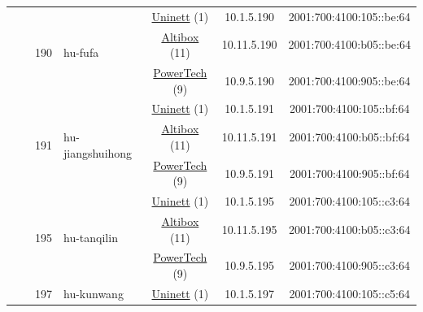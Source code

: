 \begin{small}
\begin{center}
\begin{longtable}{|c|c|c|c|c|c|c|c|}
  &  & \multirow{3}{*}{\tiny{190}} & \multicolumn{1}{|l|}{\multirow{3}{*}{\tiny{hu-fufa}}} & \multicolumn{2}{|c|}{\tiny{\href{https://www.uninett.no}{Uninett} (1)}} & \tiny{10.1.5.190} & \tiny{2001:700:4100:105::be:64} \\* \cline{5-5}\cline{6-6}\cline{7-7}\cline{8-8}
  &  &  &  & \multicolumn{2}{|c|}{\tiny{\href{https://www.altibox.no}{Altibox} (11)}} & \tiny{10.11.5.190} & \tiny{2001:700:4100:b05::be:64} \\* \cline{5-5}\cline{6-6}\cline{7-7}\cline{8-8}
  &  &  &  & \multicolumn{2}{|c|}{\tiny{\href{http://www.powertech.no}{PowerTech} (9)}} & \tiny{10.9.5.190} & \tiny{2001:700:4100:905::be:64} \\* \cline{3-3}\cline{4-4}\cline{5-5}\cline{6-6}\cline{7-7}\cline{8-8}
  &  & \multirow{3}{*}{\tiny{191}} & \multicolumn{1}{|l|}{\multirow{3}{*}{\tiny{hu-jiangshuihong}}} & \multicolumn{2}{|c|}{\tiny{\href{https://www.uninett.no}{Uninett} (1)}} & \tiny{10.1.5.191} & \tiny{2001:700:4100:105::bf:64} \\* \cline{5-5}\cline{6-6}\cline{7-7}\cline{8-8}
  &  &  &  & \multicolumn{2}{|c|}{\tiny{\href{https://www.altibox.no}{Altibox} (11)}} & \tiny{10.11.5.191} & \tiny{2001:700:4100:b05::bf:64} \\* \cline{5-5}\cline{6-6}\cline{7-7}\cline{8-8}
  &  &  &  & \multicolumn{2}{|c|}{\tiny{\href{http://www.powertech.no}{PowerTech} (9)}} & \tiny{10.9.5.191} & \tiny{2001:700:4100:905::bf:64} \\* \cline{3-3}\cline{4-4}\cline{5-5}\cline{6-6}\cline{7-7}\cline{8-8}
  &  & \multirow{3}{*}{\tiny{195}} & \multicolumn{1}{|l|}{\multirow{3}{*}{\tiny{hu-tanqilin}}} & \multicolumn{2}{|c|}{\tiny{\href{https://www.uninett.no}{Uninett} (1)}} & \tiny{10.1.5.195} & \tiny{2001:700:4100:105::c3:64} \\* \cline{5-5}\cline{6-6}\cline{7-7}\cline{8-8}
  &  &  &  & \multicolumn{2}{|c|}{\tiny{\href{https://www.altibox.no}{Altibox} (11)}} & \tiny{10.11.5.195} & \tiny{2001:700:4100:b05::c3:64} \\* \cline{5-5}\cline{6-6}\cline{7-7}\cline{8-8}
  &  &  &  & \multicolumn{2}{|c|}{\tiny{\href{http://www.powertech.no}{PowerTech} (9)}} & \tiny{10.9.5.195} & \tiny{2001:700:4100:905::c3:64} \\* \cline{3-3}\cline{4-4}\cline{5-5}\cline{6-6}\cline{7-7}\cline{8-8}
  &  & \multirow{3}{*}{\tiny{197}} & \multicolumn{1}{|l|}{\multirow{3}{*}{\tiny{hu-kunwang}}} & \multicolumn{2}{|c|}{\tiny{\href{https://www.uninett.no}{Uninett} (1)}} & \tiny{10.1.5.197} & \tiny{2001:700:4100:105::c5:64} \\* \cline{5-5}\cline{6-6}\cline{7-7}\cline{8-8}

\end{longtable}
\end{center}
\end{small}

